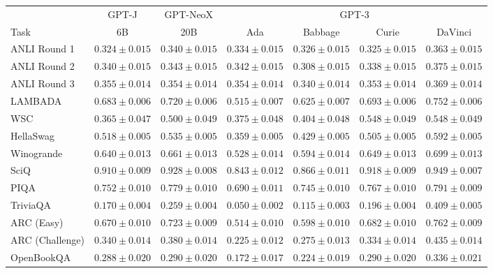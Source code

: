 \documentclass[11pt]{article}
\begin{document}
{\onecolumn
\begin{landscape}
\begin{table}    
\centering 
\begin{tabular}{l c c c c c c }
 & GPT-J & GPT-NeoX & \multicolumn{4}{c}{GPT-3} \\
Task & 6B & 20B & Ada & Babbage & Curie & DaVinci\\ \toprule
ANLI Round 1 & $0.324 \pm 0.015$ & $0.340 \pm 0.015$ & $0.334 \pm 0.015$ & $0.326 \pm 0.015$ & $0.325 \pm 0.015$ & $0.363 \pm 0.015$ \\ 
ANLI Round 2 & $0.340 \pm 0.015$ & $0.343 \pm 0.015$ & $0.342 \pm 0.015$ & $0.308 \pm 0.015$ & $0.338 \pm 0.015$ & $0.375 \pm 0.015$ \\ 
ANLI Round 3 & $0.355 \pm 0.014$ & $0.354 \pm 0.014$ & $0.354 \pm 0.014$ & $0.340 \pm 0.014$ & $0.353 \pm 0.014$ & $0.369 \pm 0.014$ \\ 
LAMBADA & $0.683 \pm 0.006$ & $0.720 \pm 0.006$ & $0.515 \pm 0.007$ & $0.625 \pm 0.007$ & $0.693 \pm 0.006$ & $0.752 \pm 0.006$ \\ 
WSC & $0.365 \pm 0.047$ & $0.500 \pm 0.049$ & $0.375 \pm 0.048$ & $0.404 \pm 0.048$ & $0.548 \pm 0.049$ & $0.548 \pm 0.049$ \\ 
HellaSwag & $0.518 \pm 0.005$ & $0.535 \pm 0.005$ & $0.359 \pm 0.005$ & $0.429 \pm 0.005$ & $0.505 \pm 0.005$ & $0.592 \pm 0.005$ \\ 
Winogrande & $0.640 \pm 0.013$ & $0.661 \pm 0.013$ & $0.528 \pm 0.014$ & $0.594 \pm 0.014$ & $0.649 \pm 0.013$ & $0.699 \pm 0.013$ \\ 
SciQ & $0.910 \pm 0.009$ & $0.928 \pm 0.008$ & $0.843 \pm 0.012$ & $0.866 \pm 0.011$ & $0.918 \pm 0.009$ & $0.949 \pm 0.007$ \\ 
PIQA & $0.752 \pm 0.010$ & $0.779 \pm 0.010$ & $0.690 \pm 0.011$ & $0.745 \pm 0.010$ & $0.767 \pm 0.010$ & $0.791 \pm 0.009$ \\ 
TriviaQA & $0.170 \pm 0.004$ & $0.259 \pm 0.004$ & $0.050 \pm 0.002$ & $0.115 \pm 0.003$ & $0.196 \pm 0.004$ & $0.409 \pm 0.005$ \\ 
ARC (Easy) & $0.670 \pm 0.010$ & $0.723 \pm 0.009$ & $0.514 \pm 0.010$ & $0.598 \pm 0.010$ & $0.682 \pm 0.010$ & $0.762 \pm 0.009$ \\ 
ARC (Challenge) & $0.340 \pm 0.014$ & $0.380 \pm 0.014$ & $0.225 \pm 0.012$ & $0.275 \pm 0.013$ & $0.334 \pm 0.014$ & $0.435 \pm 0.014$ \\ 
OpenBookQA & $0.288 \pm 0.020$ & $0.290 \pm 0.020$ & $0.172 \pm 0.017$ & $0.224 \pm 0.019$ & $0.290 \pm 0.020$ & $0.336 \pm 0.021$ \\ 

\end{tabular}
\end{table}
\end{landscape}}
\end{document}
